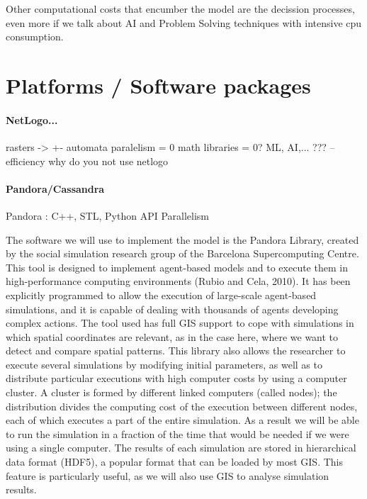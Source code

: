 \documentclass[11pt,oneside,a4paper,openright]{report}
\begin{document}
Other computational costs that encumber the model are the decission processes, even more if we talk about AI and Problem Solving techniques with intensive cpu consumption.%





\chapter{Platforms / Software packages}
		\subsubsection{NetLogo...}

		    rasters -> +- automata
		    paralelism = 0
		    math libraries = 0?
		    ML, AI,... ???
		    -- efficiency
		    why do you not use netlogo

		\subsubsection{Pandora/Cassandra}

		Pandora : C++, STL, Python API
		Parallelism %
	      
		The software we will use to implement the model is the Pandora Library, created by the social simulation
		research group of the Barcelona Supercomputing Centre. This tool is designed to implement agent-based 
		models and to execute them in high-performance computing environments (Rubio and Cela, 2010). It has been 
		explicitly programmed to allow the execution of large-scale agent-based simulations, and it is capable of 
		dealing with thousands of agents developing complex actions. The tool used has full GIS support to cope 
		with simulations in which spatial coordinates are relevant, as in the case here, where we want to detect 
		and compare spatial patterns. This library also allows the researcher to execute several simulations by 
		modifying initial parameters, as well as to distribute particular executions with high computer costs by 
		using a computer cluster. A cluster is formed by different linked computers (called nodes); the distribution 
		divides the computing cost of the execution between different nodes, each of which executes a part of the 
		entire simulation. As a result we will be able to run the simulation in a fraction of the time that would 
		be needed if we were using a single computer. The results of each simulation are stored in hierarchical data 
		format (HDF5), a popular format that can be loaded by most GIS. This feature is particularly useful, as we 
		will also use GIS to analyse simulation results.
\end{document}
